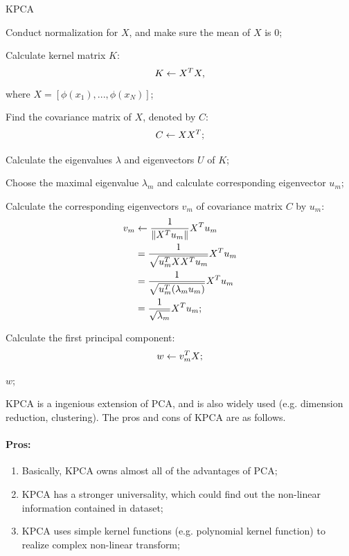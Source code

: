 \documentclass[12pt,a4paper]{article}
\theoremstyle{definition}
\begin{document}
\vspace{0.01\linewidth}
\begin{algorithm}[H]
	\caption{KPCA}
	\label{alg:pca_2}
	\vspace{0.25\baselineskip}
	
	Conduct normalization for $X$, and make sure the mean of $X$ is 0;
	
	Calculate kernel matrix $K$:
	\begin{equation*}
		\centering
		K \leftarrow X^{T}X,
	\end{equation*}
	where $X=[\phi(x_1),...,\phi(x_N)]$;
	
	Find the covariance matrix of $X$, denoted by $C$:
	\begin{equation*}
		\centering
		C \leftarrow XX^{T};
	\end{equation*}
	
	Calculate the eigenvalues $\lambda$ and eigenvectors $U$ of $K$;
	
	Choose the maximal eigenvalue $\lambda_{m}$ and calculate corresponding eigenvector $u_{m}$;
	
	Calculate the corresponding eigenvectors $v_m$ of covariance matrix $C$ by $u_m$:
	\begin{align*}
		\centering
		v_m &\leftarrow \dfrac{1}{\|X^Tu_m\|}X^Tu_m \\
		&= \dfrac{1}{\sqrt{u_m^TXX^Tu_m}}X^Tu_m \\
		&= \dfrac{1}{\sqrt{u_m^T(\lambda_m u_m)}}X^Tu_m \\
		&= \dfrac{1}{\sqrt{\lambda_m}}X^Tu_m;
	\end{align*}
		
	Calculate the first principal component:
	\begin{equation*}
		\centering
		w \leftarrow v_{m}^{T}X;
	\end{equation*}
	
	\Return $w$;
\end{algorithm}
\vspace{0.01\linewidth}

KPCA is a ingenious extension of PCA, and is also widely used (e.g. dimension reduction, clustering). The pros and cons of KPCA are as follows.

\vspace{-0.012\linewidth}
\paragraph{Pros:}
\begin{enumerate}
	\item Basically, KPCA owns almost all of the advantages of PCA;

	\item KPCA has a stronger universality, which could find out the non-linear information contained in dataset;
	
	\item KPCA uses simple kernel functions (e.g. polynomial kernel function) to realize complex non-linear transform;
\end{enumerate}
\end{document}
